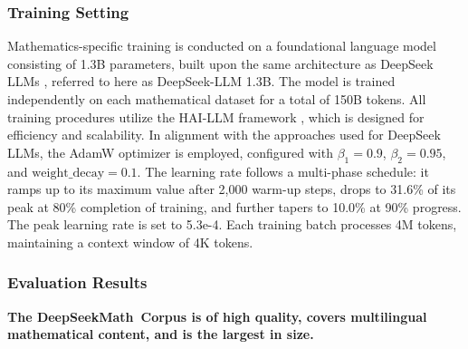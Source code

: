 \begin{itemize}[topsep=0pt]
\subsubsection{Training Setting}
\label{sec:quality-policy}
Mathematics-specific training is conducted on a foundational language model consisting of 1.3B parameters, built upon the same architecture as DeepSeek LLMs \citep{deepseek-llm}, referred to here as DeepSeek-LLM 1.3B. The model is trained independently on each mathematical dataset for a total of 150B tokens. All training procedures utilize the HAI-LLM framework \citep{haillm}, which is designed for efficiency and scalability. In alignment with the approaches used for DeepSeek LLMs, the AdamW optimizer \citep{adamW} is employed, configured with $\beta_1=0.9$, $\beta_2=0.95$, and $\mathrm{weight\_decay}=0.1$. The learning rate follows a multi-phase schedule: it ramps up to its maximum value after 2{,}000 warm-up steps, drops to 31.6\% of its peak at 80\% completion of training, and further tapers to 10.0\% at 90\% progress. The peak learning rate is set to 5.3e-4. Each training batch processes 4M tokens, maintaining a context window of 4K tokens.

\subsubsection{Evaluation Results}

\textbf{The DeepSeekMath~Corpus is of high quality, covers multilingual mathematical content, and is the largest in size.}


\end{itemize}
